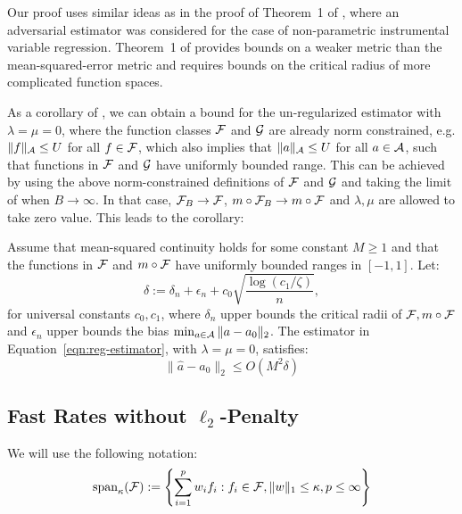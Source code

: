 Our proof uses similar ideas as in the proof of Theorem~1 of \cite{dikkala2020minimax}, where an adversarial estimator was considered for the case of non-parametric instrumental variable regression. Theorem~1 of \cite{dikkala2020minimax} provides bounds on a weaker metric than the mean-squared-error metric and requires bounds on the critical radius of more complicated function spaces.

As a corollary of , we can obtain a bound for the un-regularized estimator with $\lambda=\mu=0$, where the function classes ${\mathcal F}$ and ${\mathcal G}$ are already norm constrained, e.g. $\|f\|_{{\mathcal A}}\leq U$ for all $f\in {\mathcal F}$, which also implies that $\|a\|_{{\mathcal A}} \leq U$ for all $a\in {\mathcal A}$, such that functions in ${\mathcal F}$ and ${\mathcal G}$ have uniformly bounded range. This can be achieved by using the above norm-constrained definitions of ${\mathcal F}$ and ${\mathcal G}$ and taking the limit of  when $B\to \infty$. In that case, ${\mathcal F}_B \to {\mathcal F}$, $m\circ {\mathcal F}_B\to m\circ {\mathcal F}$ and $\lambda, \mu$ are allowed to take zero value. This leads to the corollary:

\begin{corollary}\label{cor:main-error}
Assume that mean-squared continuity holds for some constant $M\geq 1$ and that the functions in ${\mathcal F}$ and $m\circ {\mathcal F}$ have uniformly bounded ranges in $[-1, 1]$. Let:
\[
\delta:=\delta_n + \epsilon_n + c_0 \sqrt{\frac{\log(c_1/\zeta)}{n}},
\]
for universal constants $c_0, c_1$, where $\delta_n$ upper bounds the critical radii of ${\mathcal F}, m\circ {\mathcal F}$
and $\epsilon_n$ upper bounds the bias $\min_{a\in {\mathcal A}} \|a-a_0\|_2$. 
The estimator in Equation~\cref{eqn:reg-estimator}, with $\lambda=\mu=0$, satisfies:
\begin{equation}
    \|\hat{a} - a_0\|_2 \leq O\left(M^2 \delta\right)
\end{equation}
\end{corollary}

\subsection{Fast Rates without $\ell_2$-Penalty}

We will use the following notation:
\begin{equation}
\text{span}_{\kappa}({\mathcal F}) := \left\{\sum_{i=1}^p w_i f_i: f_i\in {\mathcal F}, \|w\|_1\leq \kappa, p\leq\infty\right\}
\end{equation}

